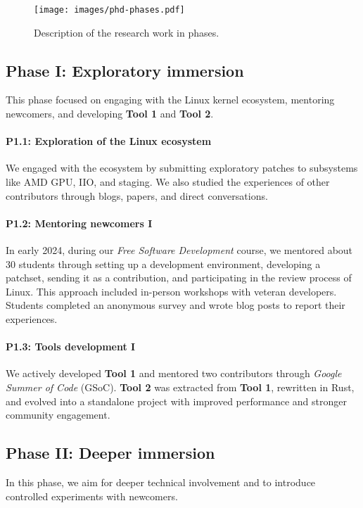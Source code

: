 \documentclass[sigconf]{acmart} %
\begin{document}
\begin{figure}[ht]
    \centering
    \texttt{[image: images/phd-phases.pdf]}
    \caption{Description of the research work in phases.\label{fig:research-work-plan}}
\end{figure}

\subsection{Phase I: Exploratory immersion}
\label{sec:workplan-schedule:phase1}
This phase focused on engaging with the Linux kernel ecosystem, mentoring
newcomers, and developing \textbf{Tool 1} and \textbf{Tool 2}.

\paragraph{P1.1: Exploration of the Linux ecosystem}
We engaged with the ecosystem by submitting exploratory patches to subsystems
like AMD GPU, IIO, and staging. We also studied the experiences of other
contributors through blogs, papers, and direct conversations.

\paragraph{P1.2: Mentoring newcomers I}
In early 2024, during our \textit{Free Software Development} course, we mentored
about 30 students through setting up a development environment, developing a
patchset, sending it as a contribution, and participating in the review process
of Linux. This approach included in-person workshops with veteran developers.
Students completed an anonymous survey and wrote blog posts to report their
experiences.

\paragraph{P1.3: Tools development I}
We actively developed \textbf{Tool 1} and mentored two contributors through
\textit{Google Summer of Code} (GSoC). \textbf{Tool 2} was extracted from
\textbf{Tool 1}, rewritten in Rust, and evolved into a standalone project with
improved performance and stronger community engagement.

\subsection{Phase II: Deeper immersion}
In this phase, we aim for deeper technical involvement and to introduce
controlled experiments with newcomers.
\end{document}
